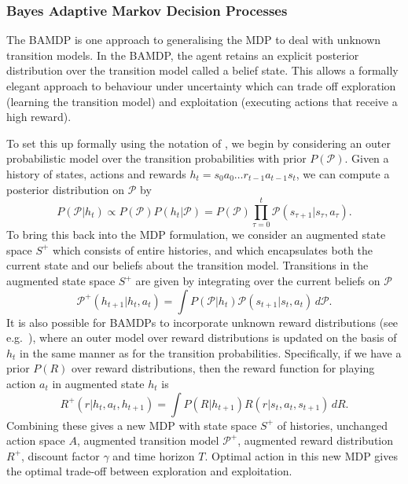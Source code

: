 \documentclass[a4paper, 10pt]{report}
\theoremstyle{plain}
\begin{document}
	
	\subsubsection{Bayes Adaptive Markov Decision Processes}
	The BAMDP \citep{duff2002optimal,ross2007bayes,guez2012efficient,ghavamzadeh2016bayesian} is one approach to generalising the MDP to deal with unknown transition models. 
	In the BAMDP, the agent retains an explicit posterior distribution over the transition model called a belief state. 
	This allows a formally elegant approach to behaviour under uncertainty which can trade off exploration (learning the transition model) and exploitation (executing actions that receive a high reward). 
	
	To set this up formally using the notation of \citet{guez2012efficient}, we begin by considering an outer probabilistic model over the transition probabilities with prior $P(\mathcal{P})$.
	Given a history of states, actions and rewards $h_t = s_0a_0\dots r_{t-1}a_{t-1}s_t$, we can compute a posterior distribution on $\mathcal{P}$ by
	\begin{equation}
	P(\mathcal{P}|h_t) \propto P(\mathcal{P})P(h_t|\mathcal{P}) = P(\mathcal{P}) \prod_{\tau=0}^t \mathcal{P}(s_{\tau+1}|s_\tau,a_\tau).
	\end{equation}
	To bring this back into the MDP formulation, we consider an augmented state space $S^+$ which consists of entire histories, and which encapsulates both the current state and our beliefs about the transition model.
	Transitions in the augmented state space $S^+$ are given by integrating over the current beliefs on $\mathcal{P}$
	\begin{equation}
	\label{eq:augmentedtransition}
	\mathcal{P}^+(h_{t+1}|h_t,a_t) = \int P(\mathcal{P}|h_t)\mathcal{P}(s_{t+1}|s_t,a_t) \, d\mathcal{P}.
	\end{equation}
	It is also possible for BAMDPs to incorporate unknown reward distributions (see e.g.~\citet{zintgraf2019varibad}), where an outer model over reward distributions is updated on the basis of $h_t$ in the same manner as for the transition probabilities. Specifically, if we have a prior $P(R)$ over reward distributions, then the reward function for playing action $a_t$ in augmented state $h_t$ is
	\begin{equation}
	R^+(r|h_t,a_t,h_{t+1}) = \int P(R|h_{t+1})R(r|s_t,a_t,s_{t+1}) \, dR.
	\end{equation}
	Combining these gives a new MDP with state space $S^+$ of histories, unchanged action space $A$, augmented transition model $\mathcal{P}^+$, augmented reward distribution $R^+$, discount factor $\gamma$ and time horizon $T$.
	Optimal action in this new MDP gives the optimal trade-off between exploration and exploitation.
	
\end{document}
